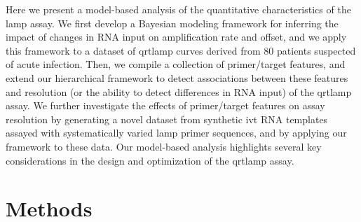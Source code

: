 \documentclass[../thesis.tex]{subfiles}
\begin{document}
Here we present a model-based analysis of the quantitative characteristics of the \gls{lamp} assay. We first develop a Bayesian modeling framework for inferring the impact of changes in RNA input on amplification rate and offset, and we apply this framework to a dataset of \gls{qrtlamp} curves derived from 80 patients suspected of acute infection. Then, we compile a collection of primer/target features, and extend our hierarchical framework to detect associations between these features and resolution (or the ability to detect differences in RNA input) of the \gls{qrtlamp} assay. We further investigate the effects of primer/target features on assay resolution by generating a novel dataset from synthetic \gls{ivt} RNA templates assayed with systematically varied \gls{lamp} primer sequences, and by applying our framework to these data. Our model-based analysis highlights several key considerations in the design and optimization of the \gls{qrtlamp} assay.

 

\enlargethispage{12pt}


\section{Methods}
\end{document}
